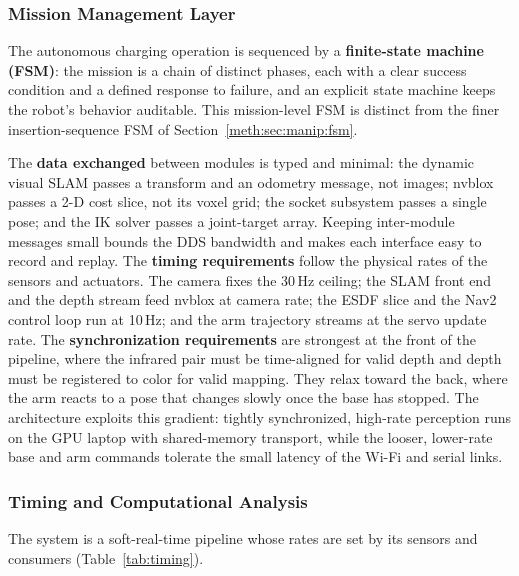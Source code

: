 \subsubsection{Mission Management Layer}\label{sec:mission}

The autonomous charging operation is sequenced by a \textbf{finite-state machine (FSM)}: the mission is a chain of distinct phases, each with a clear success condition and a defined response to failure, and an explicit state machine keeps the robot's behavior auditable. This mission-level FSM is distinct from the finer insertion-sequence FSM of Section~\ref{meth:sec:manip:fsm}.

The \textbf{data exchanged} between modules is typed and minimal: the dynamic visual SLAM passes a transform and an odometry message, not images; nvblox passes a 2-D cost slice, not its voxel grid; the socket subsystem passes a single pose; and the IK solver passes a joint-target array. Keeping inter-module messages small bounds the DDS bandwidth and makes each interface easy to record and replay. The \textbf{timing requirements} follow the physical rates of the sensors and actuators. The camera fixes the 30\,Hz ceiling; the SLAM front end and the depth stream feed nvblox at camera rate; the ESDF slice and the Nav2 control loop run at 10\,Hz; and the arm trajectory streams at the servo update rate. The \textbf{synchronization requirements} are strongest at the front of the pipeline, where the infrared pair must be time-aligned for valid depth and depth must be registered to color for valid mapping. They relax toward the back, where the arm reacts to a pose that changes slowly once the base has stopped. The architecture exploits this gradient: tightly synchronized, high-rate perception runs on the GPU laptop with shared-memory transport, while the looser, lower-rate base and arm commands tolerate the small latency of the Wi-Fi and serial links.


\subsubsection{Timing and Computational Analysis}\label{sec:timing}

The system is a soft-real-time pipeline whose rates are set by its sensors and consumers (Table~\ref{tab:timing}).

